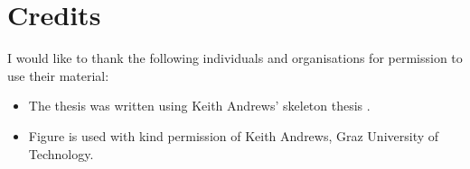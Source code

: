 %
%
% 
% 
% 


\chapter*{Credits}

I would like to thank the following individuals and organisations for
permission to use their material:
\begin{itemize}
\item The thesis was written using Keith Andrews' skeleton
  thesis \parencite{KeithThesis}.

\item Figure is used with kind permission of Keith
  Andrews, Graz University of Technology.
\end{itemize}


